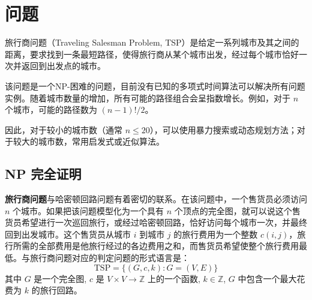 \section{问题}

旅行商问题（Traveling Salesman Problem, TSP）是给定一系列城市及其之间的距离，要求找到一条最短路径，使得旅行商从某个城市出发，经过每个城市恰好一次并返回到出发点的城市。

该问题是一个NP-困难的问题，目前没有已知的多项式时间算法可以解决所有问题实例。随着城市数量的增加，所有可能的路径组合会呈指数增长。例如，对于 $n$ 个城市，可能的路径数为 $(n-1)!/2$。

因此，对于较小的城市数（通常 $n\leq20$），可以使用暴力搜索或动态规划方法；对于较大的城市数，常用启发式或近似算法。

\subsection{NP 完全证明}

\textbf{旅行商问题}与哈密顿回路问题有着密切的联系。在该问题中，一个售货员必须访问 $n$ 个城市。如果把该问题模型化为一个具有 $n$ 个顶点的完全图，就可以说这个售货员希望进行一次巡回旅行，或经过哈密顿回路，恰好访问每个城市一次，并最终回到出发城市。这个售货员从城市 $i$ 到城市 $j$ 的旅行费用为一个整数 $c(i, j)$，旅行所需的全部费用是他旅行经过的各边费用之和，而售货员希望使整个旅行费用最低。与旅行商问题对应的判定问题的形式语言是：
\[
\text{TSP} = \{(G, c, k) : G = (V, E) \}
\]
其中 $G$ 是一个完全图, $c$ 是 $V \times V \to \mathbb{Z}$ 上的一个函数, $k \in \mathbb{Z}$, $G$ 中包含一个最大花费为 $k$ 的旅行回路。

